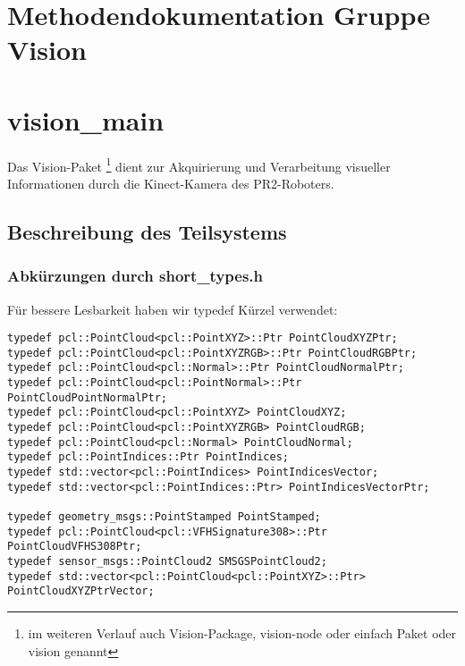 \documentclass{suturo}
\begin{document}

\newpage

\section*{Methodendokumentation Gruppe Vision}
\section{vision\_main}
Das Vision-Paket \footnote{im weiteren Verlauf auch Vision-Package, vision-node oder einfach Paket oder vision genannt} dient zur Akquirierung und Verarbeitung visueller Informationen durch die Kinect-Kamera des PR2-Roboters.

\begin{figure}[!htb]
\end{figure}
      
\subsection{Beschreibung des Teilsystems}

\subsubsection{Abkürzungen durch short\_types.h}
Für bessere Lesbarkeit haben wir typedef Kürzel verwendet:
\begin{verbatim}
typedef pcl::PointCloud<pcl::PointXYZ>::Ptr PointCloudXYZPtr;
typedef pcl::PointCloud<pcl::PointXYZRGB>::Ptr PointCloudRGBPtr;
typedef pcl::PointCloud<pcl::Normal>::Ptr PointCloudNormalPtr;
typedef pcl::PointCloud<pcl::PointNormal>::Ptr PointCloudPointNormalPtr;
typedef pcl::PointCloud<pcl::PointXYZ> PointCloudXYZ;
typedef pcl::PointCloud<pcl::PointXYZRGB> PointCloudRGB;
typedef pcl::PointCloud<pcl::Normal> PointCloudNormal;
typedef pcl::PointIndices::Ptr PointIndices;
typedef std::vector<pcl::PointIndices> PointIndicesVector;
typedef std::vector<pcl::PointIndices::Ptr> PointIndicesVectorPtr;

typedef geometry_msgs::PointStamped PointStamped;
typedef pcl::PointCloud<pcl::VFHSignature308>::Ptr PointCloudVFHS308Ptr;
typedef sensor_msgs::PointCloud2 SMSGSPointCloud2;
typedef std::vector<pcl::PointCloud<pcl::PointXYZ>::Ptr> PointCloudXYZPtrVector;
\end{verbatim}
\end{document}

